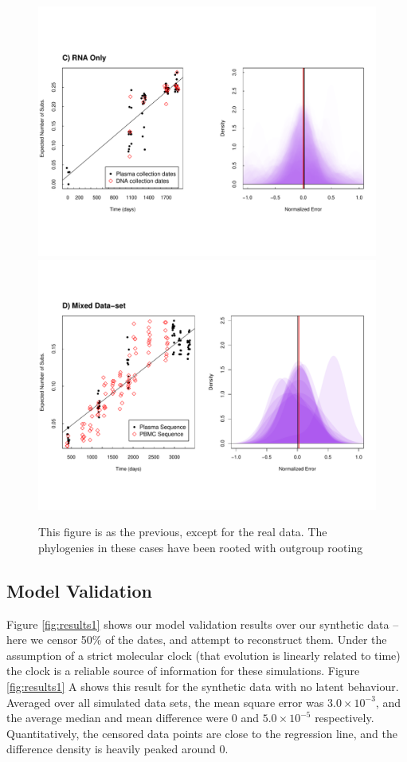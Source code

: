 \begin{figure} \label{fig:results2}
	\centering
	\includegraphics[trim=0cm 0cm 0cm 7cm, clip=true,scale=0.425]{figures/ancre.pdf}\\
	\includegraphics[trim=0cm 4cm 0cm 7cm, clip=true,scale=0.425]{figures/lanl.pdf}
	\caption[Examples]{This figure is as the previous, except for the real data.
The phylogenies in these cases have been rooted with outgroup rooting}
\end{figure}


\subsection * {Model Validation} \label{sec:sim_results}
Figure \ref{fig:results1} shows our model validation results over our synthetic data -- here we censor 50\% of the dates, and attempt to reconstruct them. 
Under the assumption of a strict molecular clock (that evolution is linearly related to time) the clock is a reliable source of information for these simulations.
Figure \ref{fig:results1} A shows this result for the synthetic data with no latent behaviour.
Averaged over all simulated data sets, the mean square error was $3.0\times 10^{-3}$, and the average median and mean difference were 0 and $5.0\times 10^{-5}$ respectively. 
Quantitatively, the censored data points are close to the regression line, and the difference density is heavily peaked around 0. 

